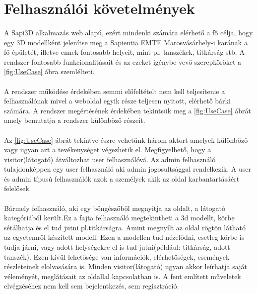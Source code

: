 \section{Felhasználói követelmények}
	\paragraph{}
	A Sapi3D alkalmazás web alapú, ezért mindenki számára elérhető
	a fő célja, hogy egy 3D modellként jelenítse meg a Sapientia EMTE Marosvásárhely-i karának a fő épületét, illetve ennek fontosabb helyeit, mint pl. tanszékek, titkárság stb.
	A rendszer fontosabb funkcionalitásait és az ezeket igénybe vevő szerepköröket a \ref{fig:UseCase} ábra szemlélteti.
	\paragraph{}
	A rendszer működése érdekében semmi előfeltételt nem kell teljesítenie a felhasználónak mivel a weboldal egyik része teljesen nyitott, elérhető bárki számára. A rendszer megértésének érdekében tekintsük meg a \ref{fig:UseCase} ábrát amely bemutatja a rendszer különböző részeit.
	\paragraph{}
	Az \ref{fig:UseCase} ábrát tekintve észre vehetünk három aktort amelyek különböző vagy ugyan azt a tevékenységet végezhetik el. Megfigyelhető, hogy a visitor(látogató) átváltozhat user felhasználóvá. Az admin felhasználó tulajdonképpen egy user felhasználó aki admin jogosultsággal rendelkezik. A user és admin típusú felhasználók azok a személyek akik az oldal karbantartásáért felelősek.
	\paragraph{}
	Bármely felhasználó, aki egy böngészőből megnyitja az oldalt, a látogató kategóriából került.Ez a fajta felhasználó megtekintheti a 3d modellt, körbe sétálhatja és el tud jutni pl.titkárságra. Amint megnyílt az oldal rögtön látható az egyetemről készített modell. Ezen a modellen tud nézelődni, esetleg körbe is tudja járni, vagy adott helységekre el is tud jutni(például: titkárság, adott tanszék). Ezen kívül lehetősége van információk, elérhetőségek, események részleteinek elolvasására is. Minden visitor(látogató) ugyan akkor leírhatja saját véleményét, meglátásait az oldallal kapcsolatban is. A fent említett műveletek elvégzéséhez nem kell sem bejelentkezés, sem regisztráció.
